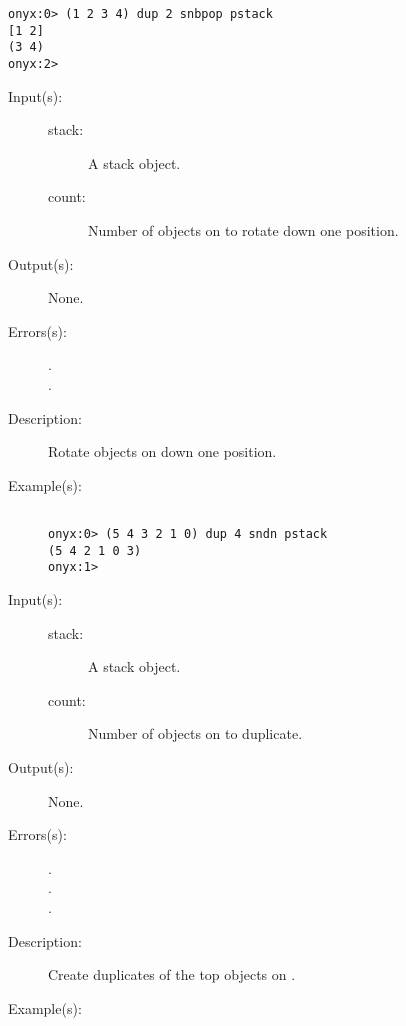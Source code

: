 \begin{description}
\begin{description}
\begin{verbatim}
onyx:0> (1 2 3 4) dup 2 snbpop pstack
[1 2]
(3 4)
onyx:2>
		\end{verbatim}
	\end{description}
\label{systemdict:sndn}
\item[{\onyxop{stack count}{sndn}{--}}: ]
	\begin{description}\item[]
	\item[Input(s): ]
		\begin{description}\item[]
		\item[stack: ]
			A stack object.
		\item[count: ]
			Number of objects on  to rotate down one
			position.
		\end{description}
	\item[Output(s): ] None.
	\item[Errors(s): ]
		\begin{description}\item[]
		\item[.]
		\item[.]
		\end{description}
	\item[Description: ]
		Rotate  objects on  down one position.
	\item[Example(s): ]\begin{verbatim}

onyx:0> (5 4 3 2 1 0) dup 4 sndn pstack
(5 4 2 1 0 3)
onyx:1>
		\end{verbatim}
	\end{description}
\label{systemdict:sndup}
\item[{\onyxop{stack count}{sndup}{--}}: ]
	\begin{description}\item[]
	\item[Input(s): ]
		\begin{description}\item[]
		\item[stack: ]
			A stack object.
		\item[count: ]
			Number of objects on  to duplicate.
		\end{description}
	\item[Output(s): ] None.
	\item[Errors(s): ]
		\begin{description}\item[]
		\item[.]
		\item[.]
		\item[.]
		\end{description}
	\item[Description: ]
		Create duplicates of the top  objects on
		.
	\item[Example(s): ]\begin{verbatim}


\end{verbatim}
\end{description}
\end{description}
